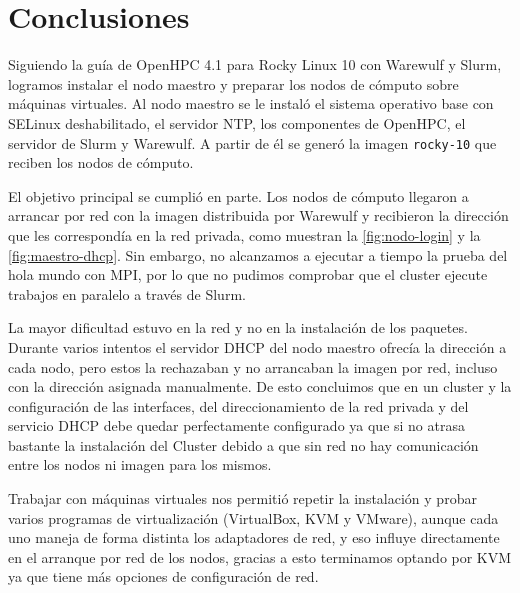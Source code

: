 \section{Conclusiones}
\label{sec:conclusiones}

Siguiendo la guía de OpenHPC 4.1 para Rocky Linux 10 con Warewulf y Slurm, logramos instalar el nodo maestro y preparar los nodos de cómputo sobre máquinas virtuales. Al nodo maestro se le instaló el sistema operativo base con SELinux deshabilitado, el servidor NTP, los componentes de OpenHPC, el servidor de Slurm y Warewulf. A partir de él se generó la imagen \texttt{rocky-10} que reciben los nodos de cómputo.

El objetivo principal se cumplió en parte. Los nodos de cómputo llegaron a arrancar por red con la imagen distribuida por Warewulf y recibieron la dirección que les correspondía en la red privada, como muestran la \cref{fig:nodo-login} y la \cref{fig:maestro-dhcp}. Sin embargo, no alcanzamos a ejecutar a tiempo la prueba del hola mundo con MPI, por lo que no pudimos comprobar que el cluster ejecute trabajos en paralelo a través de Slurm.

La mayor dificultad estuvo en la red y no en la instalación de los paquetes. Durante varios intentos el servidor DHCP del nodo maestro ofrecía la dirección a cada nodo, pero estos la rechazaban y no arrancaban la imagen por red, incluso con la dirección asignada manualmente. De esto concluimos que en un cluster y la configuración de las interfaces, del direccionamiento de la red privada y del servicio DHCP debe quedar perfectamente configurado ya que si no atrasa bastante la instalación del Cluster debido a que sin red no hay comunicación entre los nodos ni imagen para los mismos.

Trabajar con máquinas virtuales nos permitió repetir la instalación y probar varios programas de virtualización (VirtualBox, KVM y VMware), aunque cada uno maneja de forma distinta los adaptadores de red, y eso influye directamente en el arranque por red de los nodos, gracias a esto terminamos optando por KVM ya que tiene más opciones de configuración de red.

